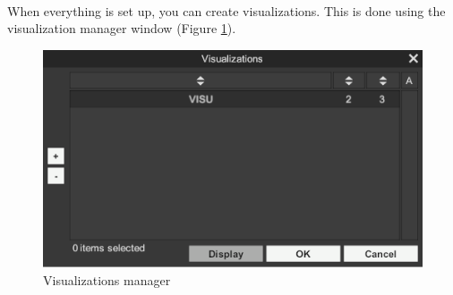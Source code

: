 \documentclass[a4paper]{article}
\begin{document}
\paragraph{} When everything is set up, you can create visualizations. This is done using the visualization manager window (Figure \ref{visuGestionUI}).
\begin{figure}[H]
\begin{center}
\includegraphics[scale=0.5]{VisualizationGestion.png}
\end{center}
\caption{\label{visuGestionUI}Visualizations manager}
\end{figure}
\end{document}

